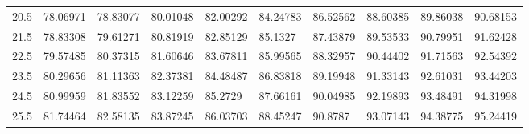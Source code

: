 \documentclass[10pt,twocolumn,letterpaper]{article}
\begin{document}
\begin{table}
{\begin{tabular}{llllllllll}
    20.5            & 78.06971                               & 78.83077                               & 80.01048                                & 82.00292                                & 84.24783                                & 86.52562                                & 88.60385                                & 89.86038                                & 90.68153                                \\
    21.5            & 78.83308                               & 79.61271                               & 80.81919                                & 82.85129                                & 85.1327                                 & 87.43879                                & 89.53533                                & 90.79951                                & 91.62428                                \\
    22.5            & 79.57485                               & 80.37315                               & 81.60646                                & 83.67811                                & 85.99565                                & 88.32957                                & 90.44402                                & 91.71563                                & 92.54392                                \\
    23.5            & 80.29656                               & 81.11363                               & 82.37381                                & 84.48487                                & 86.83818                                & 89.19948                                & 91.33143                                & 92.61031                                & 93.44203                                \\
    24.5            & 80.99959                               & 81.83552                               & 83.12259                                & 85.2729                                 & 87.66161                                & 90.04985                                & 92.19893                                & 93.48491                                & 94.31998                                \\
    25.5            & 81.74464                               & 82.58135                               & 83.87245                                & 86.03703                                & 88.45247                                & 90.8787                                 & 93.07143                                & 94.38775                                & 95.24419                                \\

\end{tabular}}
\end{table}
\end{document}
